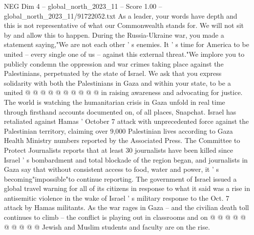 \begin{textsample}{NEG Dim 4 – global\_north\_2023\_11 – Score 1.00 – global\_north\_2023\_11/91722052.txt}
As a leader, your words have depth and this is not representative of what our Commonwealth stands for.
We will not sit by and allow this to happen.
During the Russia-Ukraine war, you made a statement saying,"We are not each other ' s enemies.
It ' s time for America to be united -- every single one of us -- against this external threat."We implore you to publicly condemn the oppression and war crimes taking place against the Palestinians, perpetuated by the state of Israel.
We ask that you express solidarity with both the Palestinians in Gaza and within your state, to be a united @ @ @ @ @ @ @ @ @ @ in raising awareness and advocating for justice.
The world is watching the humanitarian crisis in Gaza unfold in real time through firsthand accounts documented on, of all places, Snapchat.
Israel has retaliated against Hamas ' October 7 attack with unprecedented force against the Palestinian territory, claiming over 9,000 Palestinian lives according to Gaza Health Ministry numbers reported by the Associated Press.
The Committee to Protect Journalists reports that at least 30 journalists have been killed since Israel ' s bombardment and total blockade of the region began, and journalists in Gaza say that without consistent access to food, water and power, it ' s becoming"impossible"to continue reporting.
The government of Israel issued a global travel warning for all of its citizens in response to what it said was a rise in antisemitic violence in the wake of Israel ' s military response to the Oct. 7 attack by Hamas militants.
As the war rages in Gaza -- and the civilian death toll continues to climb -- the conflict is playing out in classrooms and on @ @ @ @ @ @ @ @ @ @ Jewish and Muslim students and faculty are on the rise.

\end{textsample}
